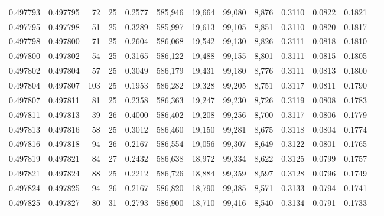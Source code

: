 \begin{tabular}{rrrrrrrrrrrrr}
0.497793 & 0.497795 &  72 &  25 &                                     0.2577 & 585,946 &  19,664 &  99,080 &   8,876 & 0.3110 & 0.0822 & 0.1821 \\
0.497795 & 0.497798 &  51 &  25 &                                     0.3289 & 585,997 &  19,613 &  99,105 &   8,851 & 0.3110 & 0.0820 & 0.1817 \\
0.497798 & 0.497800 &  71 &  25 &                                     0.2604 & 586,068 &  19,542 &  99,130 &   8,826 & 0.3111 & 0.0818 & 0.1810 \\
0.497800 & 0.497802 &  54 &  25 &                                     0.3165 & 586,122 &  19,488 &  99,155 &   8,801 & 0.3111 & 0.0815 & 0.1805 \\
0.497802 & 0.497804 &  57 &  25 &                                     0.3049 & 586,179 &  19,431 &  99,180 &   8,776 & 0.3111 & 0.0813 & 0.1800 \\
0.497804 & 0.497807 & 103 &  25 &                                     0.1953 & 586,282 &  19,328 &  99,205 &   8,751 & 0.3117 & 0.0811 & 0.1790 \\
0.497807 & 0.497811 &  81 &  25 &                                     0.2358 & 586,363 &  19,247 &  99,230 &   8,726 & 0.3119 & 0.0808 & 0.1783 \\
0.497811 & 0.497813 &  39 &  26 &                                     0.4000 & 586,402 &  19,208 &  99,256 &   8,700 & 0.3117 & 0.0806 & 0.1779 \\
0.497813 & 0.497816 &  58 &  25 &                                     0.3012 & 586,460 &  19,150 &  99,281 &   8,675 & 0.3118 & 0.0804 & 0.1774 \\
0.497816 & 0.497818 &  94 &  26 &                                     0.2167 & 586,554 &  19,056 &  99,307 &   8,649 & 0.3122 & 0.0801 & 0.1765 \\
0.497819 & 0.497821 &  84 &  27 &                                     0.2432 & 586,638 &  18,972 &  99,334 &   8,622 & 0.3125 & 0.0799 & 0.1757 \\
0.497821 & 0.497824 &  88 &  25 &                                     0.2212 & 586,726 &  18,884 &  99,359 &   8,597 & 0.3128 & 0.0796 & 0.1749 \\
0.497824 & 0.497825 &  94 &  26 &                                     0.2167 & 586,820 &  18,790 &  99,385 &   8,571 & 0.3133 & 0.0794 & 0.1741 \\
0.497825 & 0.497827 &  80 &  31 &                                     0.2793 & 586,900 &  18,710 &  99,416 &   8,540 & 0.3134 & 0.0791 & 0.1733 \\

\end{tabular}
